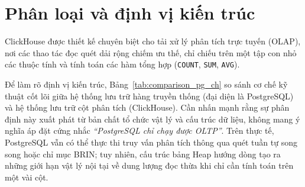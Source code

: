 \documentclass[13pt,a4paper]{report}
\begin{document}
\section{Phân loại và định vị kiến trúc}
ClickHouse được thiết kế chuyên biệt cho tải xử lý phân tích trực tuyến (OLAP), nơi các thao tác đọc quét dải rộng chiếm ưu thế, chỉ chiếu trên một tập con nhỏ các thuộc tính và tính toán các hàm tổng hợp (\texttt{COUNT}, \texttt{SUM}, \texttt{AVG}).

Để làm rõ định vị kiến trúc, Bảng~\ref{tab:comparison_pg_ch} so sánh cơ chế kỹ thuật cốt lõi giữa hệ thống lưu trữ hàng truyền thống (đại diện là PostgreSQL) và hệ thống lưu trữ cột phân tích (ClickHouse). Cần nhấn mạnh rằng sự phân định này xuất phát từ bản chất tổ chức vật lý và cấu trúc dữ liệu, không mang ý nghĩa áp đặt cứng nhắc \textit{``PostgreSQL chỉ chạy được OLTP''}. Trên thực tế, PostgreSQL vẫn có thể thực thi truy vấn phân tích thông qua quét tuần tự song song hoặc chỉ mục BRIN; tuy nhiên, cấu trúc bảng Heap hướng dòng tạo ra những giới hạn vật lý nội tại về dung lượng đọc thừa khi chỉ cần tính toán trên một vài cột.
\end{document}
